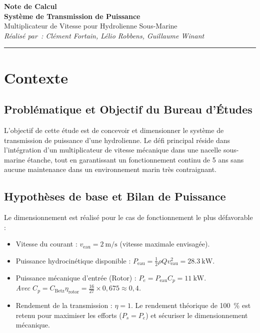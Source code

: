 \documentclass[11pt,a4paper]{article}
\begin{document}
\begin{center}
    \vspace*{0.3cm}
    {\Huge \bfseries \color{MarineBlue} Note de Calcul} \\[0.3cm]
    {\Large \bfseries \color{TealAccent} Système de Transmission de Puissance} \\[0.2cm]
    {\large \color{DarkText} Multiplicateur de Vitesse pour Hydrolienne Sous-Marine} \\[0.5cm]
    {\normalsize \textit{Réalisé par~: Clément Fortain, Lélio Robbens, Guillaume Winant}} \\[0.5cm]
    \textcolor{MarineBlue}{\rule{8cm}{1.5pt}}
    \vspace*{0.8cm}
\end{center}

\section{Contexte}

\subsection{Problématique et Objectif du Bureau d'Études}
L'objectif de cette étude est de concevoir et dimensionner le système de transmission de puissance d'une hydrolienne. Le défi principal réside dans l'intégration d'un multiplicateur de vitesse mécanique dans une nacelle sous-marine étanche, tout en garantissant un fonctionnement continu de 5 ans sans aucune maintenance dans un environnement marin très contraignant. 

\subsection{Hypothèses de base et Bilan de Puissance}
Le dimensionnement est réalisé pour le cas de fonctionnement le plus défavorable :
\begin{itemize}
    \item Vitesse du courant : $v_{\text{eau}} = \qty{2}{\meter\per\second}$ (vitesse maximale envisagée).
    \item Puissance hydrocinétique disponible : $P_{\text{eau}} = \frac{1}{2} \rho Q v_{\text{eau}}^2 = \qty{28.3}{\kilo\watt}$.
    \item Puissance mécanique d'entrée (Rotor) : $P_e = P_{\text{eau}} C_p = \qty{11}{\kilo\watt}$.\\
    \textit{Avec $C_p = C_{\text{Betz}} \eta_{\text{rotor}} = \frac{16}{27} \times 0{,}675 \approx 0{,}4$.}
    \item Rendement de la transmission : $\eta = 1$. Le rendement théorique de \qty{100}{\percent} est retenu pour maximiser les efforts ($P_s = P_e$) et sécuriser le dimensionnement mécanique.
\end{itemize}
\end{document}

